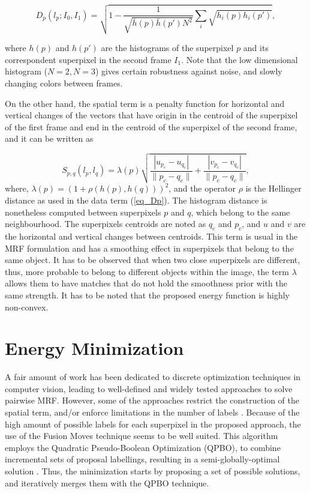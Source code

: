 \begin{equation}
D_p(l_p;I_0,I_1) = \sqrt{ 1 - \frac{1}{\sqrt{\bar{h}(p)\bar{h}(p')N^2} } \sum_{i}\sqrt{h_{i}(p)h_{i}(p')} },
\label{eq_Dp}
\end{equation}

\noindent where $h(p)$ and $h(p')$ are the histograms of the superpixel $p$ and its correspondent superpixel in the
second frame $I_1$. 
Note that the low dimensional histogram ($N=2, N=3$) gives certain robustness against noise,
and slowly changing colors between frames. 

On the other hand, the spatial term is a penalty function for horizontal
and vertical changes of the vectors that have origin in the centroid of the superpixel of the first frame and
end in the centroid of the superpixel of the second frame, and it can be written as

\begin{equation}
S_{p,q}(l_p, l_q) = \lambda(p)
  \sqrt{\frac{|u_{p_c}-u_{q_c}|}{\|p_c-q_c\|}+ \frac{|v_{p_c}-v_{q_c}|}{\|p_c-q_c\|}},
\label{eq_Spq}
\end{equation}
 where, $ \lambda(p) = (1 + \rho(h(p),h(q)))^2 $, and the operator $\rho$ is the Hellinger distance as used in the
data term (\ref{eq_Dp}). The histogram distance is nonetheless computed between superpixels $p$ and $q$, 
which belong to the same neighbourhood. The superpixels centroids are noted as $q_c$ and $p_c$, 
and $u$ and $v$ are the horizontal and vertical changes between centroids.
This term is usual in the MRF formulation and has a smoothing effect in superpixels that belong to the
same object. It has to be observed that when two close superpixels are different, thus, more probable to
belong to different objects within the image, the term $\lambda$ allows them to have
matches that do not hold the smoothness prior with the same strength. 
It has to be noted that the proposed energy function is highly non-convex.

\section{Energy Minimization}

A fair amount of work has been dedicated to discrete optimization techniques in computer vision,
leading to well-defined and widely tested approaches to solve pairwise MRF\cite{c3}\cite{c4}.
However, some of the approaches restrict the construction of the spatial term, and/or enforce
limitations in the number of labels \cite{c3}.
Because of the high amount of possible labels for  each superpixel in the proposed approach, the use of the
Fusion Moves \cite{c7} technique seems to be well suited.
This algorithm employs the Quadratic Pseudo-Boolean Optimization (QPBO), to combine
incremental sets of proposal labellings, resulting in a semi-globally-optimal solution \cite{c4}.
Thus, the minimization starts by proposing a set of possible solutions, and iteratively merges them with
the QPBO technique. 

